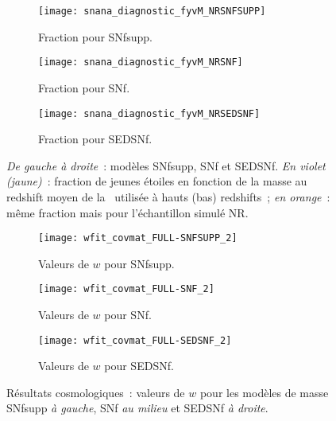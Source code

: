 \documentclass[../main/main.tex]{subfiles}
\begin{document}
\begin{landscape}
\begin{figure}[p]
    \centerfloat
    \vspace{-0.5cm}
    \begin{subfigure}[]{.30\linewidth}
        \centering
        \texttt{[image: snana\_diagnostic\_fyvM\_NRSNFSUPP]}
        \caption[Fraction pour SEDSNf]{Fraction pour SNfsupp.}
        \label{fig:fyvMsnfsupp}
    \end{subfigure}
    \centering
    \begin{subfigure}[]{.30\linewidth}
        \centering
        \texttt{[image: snana\_diagnostic\_fyvM\_NRSNF]}
        \caption[Fraction pour SEDSNf]{Fraction pour SNf.}
        \label{fig:fyvMsnf}
    \end{subfigure}
    \begin{subfigure}[]{.30\linewidth}
        \centering
        \texttt{[image: snana\_diagnostic\_fyvM\_NRSEDSNF]}
        \caption[Fraction pour SEDSNf]{Fraction pour SEDSNf.}
        \label{fig:fyvMsed}
    \end{subfigure}
    \caption[Évolution de la fraction de jeunes étoiles en fonction de la masse
    pour les différents modèles de masse]{\textit{De gauche à droite}~: modèles
        SNfsupp, SNf et SEDSNf. \textit{En violet (jaune)}~: fraction de jeunes
        étoiles en fonction de la masse au redshift moyen de la \hostlib\
        utilisée à hauts (bas) redshifts~; \textit{en orange}~: même fraction
    mais pour l'échantillon simulé NR.}
    \label{fig:fyvM}
\end{figure}

\begin{figure}[h!]
    \centerfloat
    \begin{subfigure}[]{.30\linewidth}
        \centering
        \texttt{[image: wfit\_covmat\_FULL-SNFSUPP\_2]}
        \caption[Valeurs de $w$ avec le modèle de masse SNf]{Valeurs de
        $w$ pour SNfsupp.}
        \label{fig:wsnfsupp}
    \end{subfigure}
    \begin{subfigure}[]{.30\linewidth}
        \centering
        \texttt{[image: wfit\_covmat\_FULL-SNF\_2]}
        \caption[Valeurs de $w$ avec le modèle de masse SNf]{Valeurs de
        $w$ pour SNf.}
        \label{fig:wsnf}
    \end{subfigure}
    \begin{subfigure}[]{.30\linewidth}
        \centering
        \texttt{[image: wfit\_covmat\_FULL-SEDSNF\_2]}
        \caption[Valeurs de $w$ avec le modèle de masse SEDSNf]{Valeurs de
        $w$ pour SEDSNf.}
        \label{fig:wsed}
    \end{subfigure}
    \caption[Résultats cosmologiques~: $w$ selon le modèle de
    masse]{Résultats cosmologiques~: valeurs de $w$ pour les modèles de
        masse SNfsupp \textit{à gauche}, SNf \textit{au milieu} et SEDSNf
    \textit{à droite}.}
    \label{fig:wdiff}
\end{figure}
\end{landscape}
\end{document}
